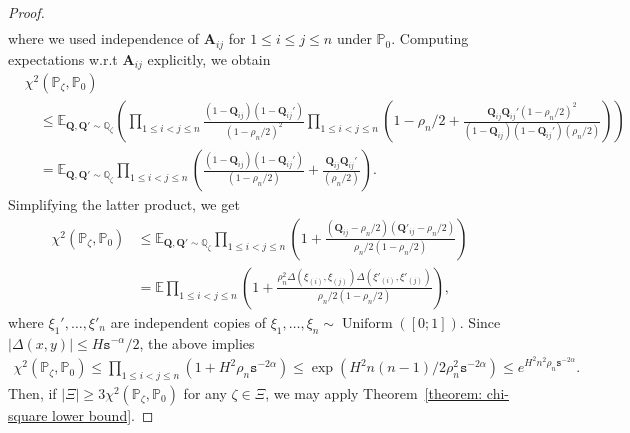 \documentclass[11pt]{article}
\newcommand{\bA}{\bm{A}}
\newcommand{\bQ}{\bm{Q}}
\newcommand{\bbE}{\mathbb{E}}
\newcommand{\bbP}{\mathbb{P}}
\newcommand{\bbQ}{\mathbb{Q}}
\newcommand{\<}{\langle}
\renewcommand{\>}{\rangle}
\newcommand{\ts}{\mathtt{s}}
\theoremstyle{plain}
\theoremstyle{definition}
\theoremstyle{remark}
\begin{document}
{\begin{proof}
\begin{align*}
\end{align*}
where we used independence of $\bA_{ij}$ for $1 \le i \le j \le n$ under $\bbP_0$. Computing expectations w.r.t $\bA_{ij}$ explicitly, we obtain 
\begin{align*}
    & \chi^2(\bbP_\zeta, \bbP_0) \\
    & \quad \le \bbE_{\bQ, \bQ' \sim \bbQ_{\zeta}} \left ( \prod_{1 \le i < j \le n} \frac{(1 - \bQ_{ij}) (1 - \bQ_{ij}')}{(1 - \rho_n/2)^2} \prod_{1 \le i < j \le n} \left ( 1 - \rho_n /2 + \frac{\bQ_{ij} \bQ_{ij}' (1 - \rho_n/2)^2}{(1 - \bQ_{ij}) (1 - \bQ_{ij}') (\rho_n/2)} \right ) \right ) \\
    & \quad = \bbE_{\bQ, \bQ' \sim \bbQ_{\zeta}} \prod_{1 \le i < j \le n} \left ( \frac{(1 - \bQ_{ij}) (1 - \bQ_{ij}')}{ (1 - \rho_n/2)} + \frac{\bQ_{ij} \bQ_{ij}'}{(\rho_n/2)} \right ).
\end{align*}
Simplifying the latter product, we get
\begin{align*}
    \chi^2(\bbP_\zeta, \bbP_0) & \le \bbE_{\bQ, \bQ' \sim \bbQ_{\zeta}} \prod_{1 \le i < j \le n} \left (1 + \frac{(\bQ_{ij} - \rho_n/2) (\bQ'_{ij} - \rho_n/2)}{\rho_n/2(1 - \rho_n/2)} \right ) \\
    & = \bbE \prod_{1 \le i < j \le n} \left (1 + \frac{\rho_n^2 \Delta(\xi_{(i)}, \xi_{(j)})\Delta(\xi'_{(i)}, \xi'_{(j)})}{\rho_n/2(1 - \rho_n/2)} \right ),
\end{align*}
where $\xi_1', \ldots, \xi'_n$ are independent copies of $\xi_1, \ldots, \xi_n \sim \operatorname{Uniform}([0;1])$. Since $|\Delta(x, y)| \le H \ts^{-\alpha} / 2$, the above implies
\begin{align*}
    \chi^2(\bbP_{\zeta}, \bbP_0) \le \prod_{1 \le i < j \le n} \left ( 1 + H^2 \rho_n \ts^{-2 \alpha} \right ) \le \exp \left ( H^2 n (n - 1)/2 \rho_n^2 \ts^{- 2 \alpha}\right ) \le e^{H^2 n^2 \rho_n \ts^{-2 \alpha}}.
\end{align*}
Then, if $|\Xi| \ge 3\chi^2(\bbP_{\zeta}, \bbP_0)$ for any $\zeta \in \Xi$, we may apply Theorem~\ref{theorem: chi-square lower bound}.


\end{proof}}
\end{document}
